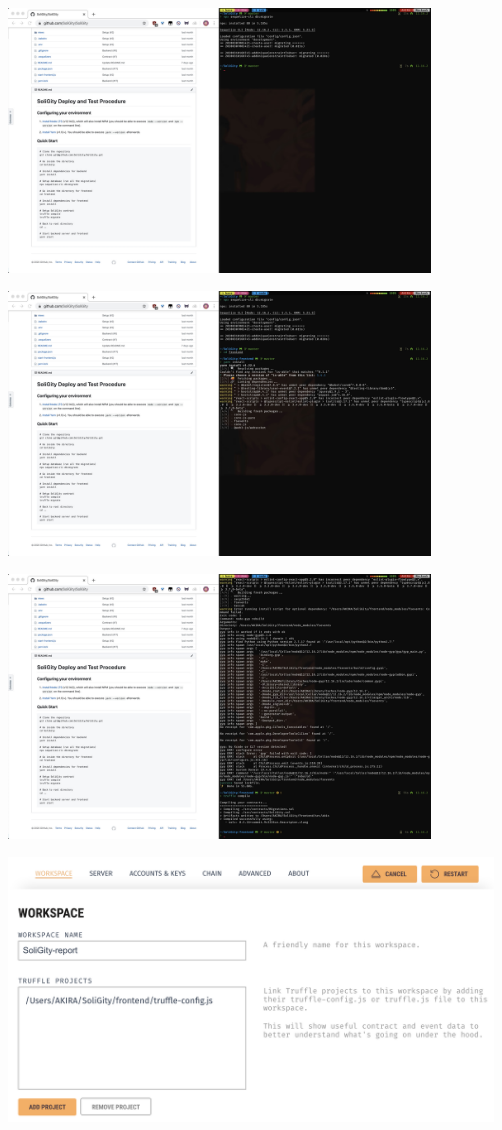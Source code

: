 \documentclass[12pt]{article}
\renewcommand{\_}{\kern-1.5pt\textunderscore\kern-1.5pt}
\begin{document}
\includegraphics[height=7cm]{graphs/03. user_db_migrate}

\includegraphics[height=7cm]{graphs/04. yarn_install_frontend}

\includegraphics[height=7cm]{graphs/05. truffle_compile}

\includegraphics[height=7cm]{graphs/06. ganache_setup}
\end{document}
